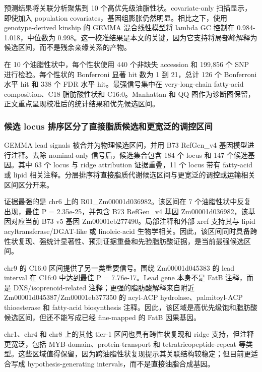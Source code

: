 \documentclass[
]{article}
\begin{document}
预测结果将关联分析聚焦到 10 个高优先级油脂性状。covariate-only
扫描显示，即使加入 population
covariates，基因组膨胀仍然明显。相比之下，使用 genotype-derived kinship
的 GEMMA 混合线性模型将 lambda GC 控制在 0.984-1.018，中位数为
0.998。这一校准结果是本文的关键，因为它支持将局部峰解释为候选区间，而不是残余亲缘关系的产物。

在 10 个油脂性状中，每个性状使用 440 个非缺失 accession 和 199,856 个
SNP 进行检验。每个性状的 Bonferroni 显著 hit 数为 1 到 21，总计 126 个
Bonferroni 水平 hit 和 338 个 FDR 水平 hit。最强信号集中在
very-long-chain fatty-acid composition、C18 脂肪酸性状和
C16:0。Manhattan 和 QQ
图作为诊断图保留，正文重点呈现校准后的统计结果和优先候选区间。

\subsubsection{候选 locus
排序区分了直接脂质候选和更宽泛的调控区间}\label{ux5019ux9009-locus-ux6392ux5e8fux533aux5206ux4e86ux76f4ux63a5ux8102ux8d28ux5019ux9009ux548cux66f4ux5bbdux6cdbux7684ux8c03ux63a7ux533aux95f4}

GEMMA lead signals 被合并为物理候选区间，并用 B73 RefGen\_v4
基因模型进行注释。去除 nominal-only 信号后，候选集合包含 184 个 locus 和
147 个候选基因。其中 63 个 locus 与 ridge attribution 证据重叠，11 个
locus 带有 fatty-acid 或 lipid
相关注释。分层排序将直接脂质代谢候选区间与更宽泛的调控或运输相关区间区分开来。

证据最强的是 chr6 上的 R01\_Zm00001d036982。该区间在 7
个油脂性状中反复出现，最佳 P = 2.35e-25，并包含 B73 RefGen\_v4 基因
Zm00001d036982，该基因对应当前 B73 v5 基因
Zm00001eb277490。局部注释和外部 xref 支持其与 lipid
acyltransferase/DGAT-like 或 linoleic-acid
生物学相关。因此，该区间同时具备跨性状复现、强统计显著性、预测证据重叠和先验脂肪酸证据，是当前最强候选区间。

chr9 的 C16:0 区间提供了另一类重要信号。围绕 Zm00001d045383 的 lead
interval 在 C16:0 中达到最佳 P = 7.76e-17。Lead gene 本身不是 FatB
注释，而是 DXS/isoprenoid-related 注释；更强的脂肪酸解释来自附近
Zm00001d045387/Zm00001eb377350 的 acyl-ACP hydrolase、palmitoyl-ACP
thioesterase 和 fatty-acid biosynthesis
注释。因此，该区域是高优先级饱和脂肪酸候选区间，但还不能写成已经
fine-mapped 的 FatB 因果基因。

chr1、chr4 和 chr8 上的其他 tier-1 区间也具有跨性状复现和 ridge
支持，但注释更宽泛，包括 MYB-domain、protein-transport 和
tetratricopeptide-repeat
等类型。这些区域值得保留，因为跨油脂性状复现提示其关联结构较稳定；但目前更适合写成
hypothesis-generating intervals，而不是直接油脂合成基因。
\end{document}
